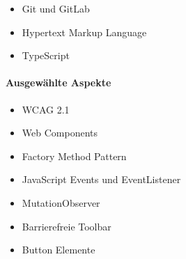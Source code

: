 \begin{itemize}
	\item Git und GitLab
	\item Hypertext Markup Language
	\item TypeScript
\end{itemize}

\paragraph{Ausgewählte Aspekte}

\begin{itemize}
	\item WCAG 2.1
	\item Web Components
	\item Factory Method Pattern
	\item JavaScript Events und EventListener
	\item MutationObserver
	\item Barrierefreie Toolbar
	\item Button Elemente
\end{itemize}